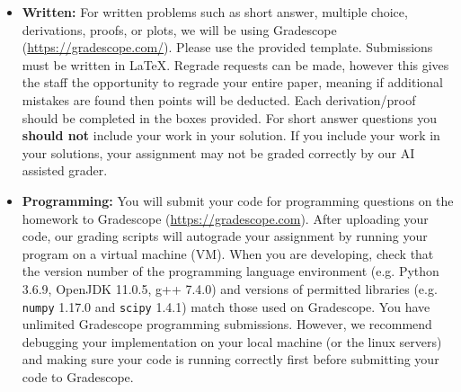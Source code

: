 \documentclass[11pt,addpoints,answers]{exam}
\begin{document}
\begin{itemize}
\begin{itemize}
\begin{comment}
  \item \textbf{Autolab:} You will submit your code for programming
    questions on the homework to Autolab
    (\url{https://autolab.andrew.cmu.edu/}). After uploading your code,
    our grading scripts will autograde your assignment by running your
    program on a virtual machine (VM). 
    When you are developing, check that the
    version number of the programming language environment
    (e.g. Python 2.7.6/3.6.8, Octave 3.8.2, OpenJDK 1.8.0, g++ 4.8.5) and
    versions of permitted libraries (e.g.  \texttt{numpy} 1.11.1 and \texttt{scipy} 0.18.1) 
    match those used on Autolab. DO NOT use any 3rd party
    python packages (i.e. \texttt{sklearn} or \texttt{pandas}) in your implementation! 
    Note: Also do not use \texttt {numpy.loadtxt()}.
    (Octave users: Please make sure you do not use any
    Matlab-specific libraries in your code that might make it fail
    against our tests.)
    You have a {\bf total of 10 Autolab submissions}. Use them
    wisely. In order to not waste Autolab submissions, we recommend
    debugging your implementation on the linux servers to make sure 
    your code is running correctly first
    before any Autolab submission. 
\end{comment}
    
    \item \textbf{Written:} For written problems such as short answer, multiple choice, derivations, proofs, or plots, we will be using Gradescope (\url{https://gradescope.com/}). Please use the provided template. Submissions must be written in LaTeX. Regrade requests can be made, however this gives the staff the opportunity to regrade your entire paper, meaning if additional mistakes are found then points will be deducted.
    Each derivation/proof should be completed in the boxes provided. For short answer questions you \textbf{should not} include your work in your solution.  If you include your work in your solutions, your assignment may not be graded correctly by our AI assisted grader.

    \item \textbf{Programming:} You will submit your code for programming questions on the homework to Gradescope (\url{https://gradescope.com}). After uploading your code, our grading scripts will autograde your assignment by running your program on a virtual machine (VM). When you are developing, check that the version number of the programming language environment (e.g. Python 3.6.9, OpenJDK 11.0.5, g++ 7.4.0) and versions of permitted libraries (e.g.  \texttt{numpy} 1.17.0 and \texttt{scipy} 1.4.1) match those used on Gradescope. You have unlimited Gradescope programming submissions. However, we recommend debugging your implementation on your local machine (or the linux servers) and making sure your code is running correctly first before submitting your code to Gradescope.


\end{itemize}
\end{itemize}
\end{document}
